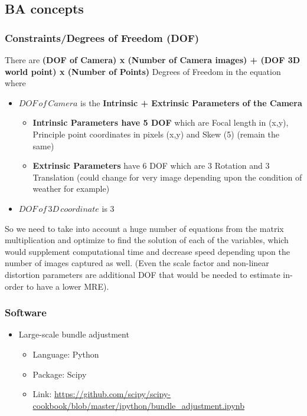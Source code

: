 \documentclass{article}[11pt]
\begin{document}
\subsection{BA concepts}
\subsubsection{Constraints/Degrees of Freedom (DOF)}
There are 
 \textbf{(DOF of Camera) x (Number of Camera images) + (DOF 3D world point) x (Number of Points)} Degrees of Freedom in the equation
 where
 \begin{itemize}
     \item $DOF \, of \, Camera$ is the \textbf{Intrinsic + Extrinsic Parameters of the Camera}
     \begin{itemize}
         \item \textbf{Intrinsic Parameters have 5 DOF} which are Focal length in (x,y), Principle point coordinates in pixels (x,y) and Skew (5) (remain the same)
         \item \textbf{Extrinsic Parameters} have 6 DOF which are 3 Rotation and 3 Translation (could change for very image depending upon the condition of weather for example)
     \end{itemize}
     \item $DOF \, of \, 3D  \, coordinate$ is 3
 \end{itemize}


So we need to take into account a huge number of equations from the matrix multiplication and optimize to find the solution of each of the variables, which would supplement computational time and decrease speed depending upon the number of images captured as well. (Even the scale factor and non-linear distortion parameters are additional DOF that would be needed to estimate in-order to have a lower MRE).


\subsubsection{Software}
\begin{itemize}
    \item Large-scale bundle adjustment
    \begin{itemize}
        \item Language: Python
        \item Package: Scipy
        \item Link: \url{https://github.com/scipy/scipy-cookbook/blob/master/ipython/bundle_adjustment.ipynb}
        
    \end{itemize}
\end{itemize}
\end{document}
